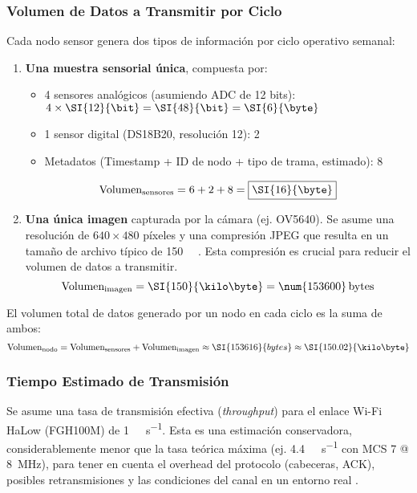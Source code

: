 \subsubsection{Volumen de Datos a Transmitir por Ciclo}
\label{ssubsec:volumen_datos}
Cada nodo sensor genera dos tipos de información por ciclo operativo semanal:

\begin{enumerate}
    \item \textbf{Una muestra sensorial única}, compuesta por:
    \begin{itemize}
        \item 4 sensores analógicos (asumiendo ADC de 12 bits): 
        $4 \times \SI{12}{\bit} = \SI{48}{\bit} = \SI{6}{\byte}$
        \item 1 sensor digital (DS18B20, resolución \SI{12}{\bit}): \SI{2}{\byte}
        \item Metadatos (Timestamp + ID de nodo + tipo de trama, estimado): \SI{8}{\byte}
    \end{itemize}
    \[
    \text{Volumen}_{\text{sensores}} = 6 + 2 + 8 = \boxed{\SI{16}{\byte}}
    \]

    \item \textbf{Una única imagen} capturada por la cámara (ej. OV5640). 
    Se asume una resolución de \(640 \times 480\) píxeles y una compresión JPEG que resulta en un tamaño de archivo típico de \SI{150}{\kilo\byte} \cite{jpegCompression}. 
    Esta compresión es crucial para reducir el volumen de datos a transmitir.
    \[
    \text{Volumen}_{\text{imagen}} = \SI{150}{\kilo\byte} = \num{153600}\,\text{bytes}
    \]
\end{enumerate}

El volumen total de datos generado por un nodo en cada ciclo es la suma de ambos:
\[
\text{Volumen}_{\text{nodo}} = \text{Volumen}_{\text{sensores}} + \text{Volumen}_{\text{imagen}} \approx \SI{153616}{bytes} \approx \SI{150.02}{\kilo\byte}
\]

\subsubsection{Tiempo Estimado de Transmisión}
\label{ssubsec:tiempo_tx}
Se asume una tasa de transmisión efectiva (\textit{throughput}) para el enlace Wi-Fi HaLow (FGH100M) de \SI{1}{\mega\bit\per\second}. Esta es una estimación conservadora, considerablemente menor que la tasa teórica máxima (ej. \SI{4.4}{\mega\bit\per\second} con MCS 7 @ \SI{8}{\mega\hertz}), para tener en cuenta el overhead del protocolo (cabeceras, ACK), posibles retransmisiones y las condiciones del canal en un entorno real \cite{ieee80211ah}.

